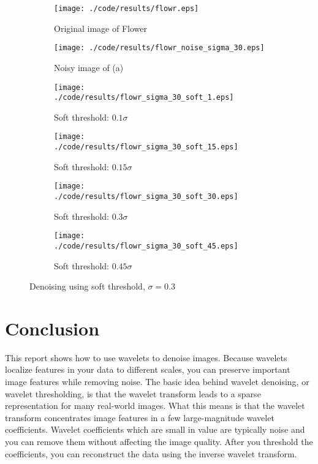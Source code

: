 \documentclass[journal,comsoc]{IEEEtran}
\begin{document}
\begin{figure}[!hbt]
  \centering
  \begin{subfigure}{.25\textwidth}
    \centering
    \texttt{[image: ./code/results/flowr.eps]}
    \caption{Original image of Flower}
    \label{subfig:original-image-of-flower}
  \end{subfigure}%
  \begin{subfigure}{.25\textwidth}
    \centering
    \texttt{[image: ./code/results/flowr\_noise\_sigma\_30.eps]}
    \caption{Noisy image of (a)}
    \label{subfig:flower-sigma-10-noisy-image-of-a}
  \end{subfigure}

  \begin{subfigure}{0.25\textwidth}
    \centering{}
    \texttt{[image: ./code/results/flowr\_sigma\_30\_soft\_1.eps]}
    \caption{Soft threshold: $0.1\sigma$}
  \end{subfigure}%
  \begin{subfigure}{.25\textwidth}
    \centering{}
    \texttt{[image: ./code/results/flowr\_sigma\_30\_soft\_15.eps]}
    \caption{Soft threshold: $0.15\sigma$}
  \end{subfigure}

  \begin{subfigure}{0.25\textwidth}
    \centering{}
    \texttt{[image: ./code/results/flowr\_sigma\_30\_soft\_30.eps]}
    \caption{Soft threshold: $0.3\sigma$}
  \end{subfigure}%
  \begin{subfigure}{.25\textwidth}
    \centering{}
    \texttt{[image: ./code/results/flowr\_sigma\_30\_soft\_45.eps]}
    \caption{Soft threshold: $0.45\sigma$}
  \end{subfigure}
  
  \caption{Denoising using soft threshold, $\sigma=0.3$}
  \label{fig:flower-sigma-30-soft-threshold}
\end{figure}


\section{Conclusion}

This report shows how to use wavelets to denoise images. Because wavelets localize
features in your data to different scales, you can preserve important image features
while removing noise. The basic idea behind wavelet denoising, or wavelet thresholding,
is that the wavelet transform leads to a sparse representation for many real-world images.
What this means is that the wavelet transform concentrates image features in a few
large-magnitude wavelet coefficients. Wavelet coefficients which are small in value are
typically noise and you can remove them without affecting the image quality. After you
threshold the coefficients, you can reconstruct the data using the inverse wavelet transform.
\end{document}
